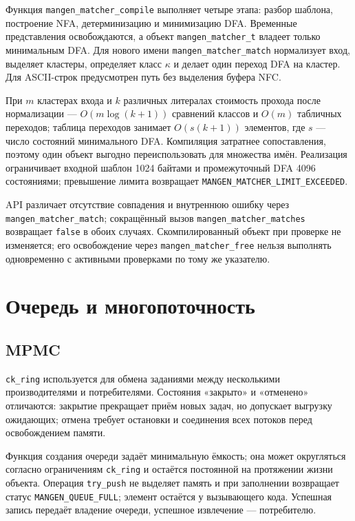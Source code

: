 \documentclass[12pt,a4paper]{article}
\begin{document}
Функция \texttt{mangen\_matcher\_compile} выполняет четыре этапа:
разбор шаблона, построение NFA, детерминизацию и минимизацию DFA.
Временные представления освобождаются, а объект
\texttt{mangen\_matcher\_t} владеет только минимальным DFA.
Для нового имени \texttt{mangen\_matcher\_match} нормализует вход,
выделяет кластеры, определяет класс $\kappa$ и делает один переход DFA
на кластер. Для ASCII-строк предусмотрен путь без выделения буфера NFC.

При $m$ кластерах входа и $k$ различных литералах стоимость
прохода после нормализации --- $O(m\log(k+1))$ сравнений классов
и $O(m)$ табличных переходов; таблица переходов занимает
$O(s(k+1))$ элементов, где $s$ --- число состояний минимального DFA.
Компиляция затратнее сопоставления, поэтому один объект выгодно
переиспользовать для множества имён. Реализация ограничивает входной
шаблон 1024 байтами и промежуточный DFA 4096 состояниями;
превышение лимита возвращает \texttt{MANGEN\_MATCHER\_LIMIT\_EXCEEDED}.

API различает отсутствие совпадения и внутреннюю ошибку через
\texttt{mangen\_matcher\_match}; сокращённый вызов
\texttt{mangen\_matcher\_matches} возвращает \texttt{false}
в обоих случаях. Скомпилированный объект при проверке не изменяется;
его освобождение через \texttt{mangen\_matcher\_free} нельзя выполнять
одновременно с активными проверками по тому же указателю.

\section{Очередь и многопоточность}

\subsection{MPMC}

\texttt{ck\_ring} используется для обмена заданиями между несколькими
производителями и потребителями. Состояния «закрыто» и «отменено» отличаются:
закрытие прекращает приём новых задач, но допускает выгрузку ожидающих;
отмена требует остановки и соединения всех потоков перед освобождением памяти.

Функция создания очереди задаёт минимальную ёмкость; она может
округляться согласно ограничениям \texttt{ck\_ring} и остаётся
постоянной на протяжении жизни объекта. Операция \texttt{try\_push}
не выделяет память и при заполнении возвращает статус
\texttt{MANGEN\_QUEUE\_FULL}; элемент остаётся у вызывающего кода.
Успешная запись передаёт владение очереди, успешное извлечение ---
потребителю.
\end{document}
